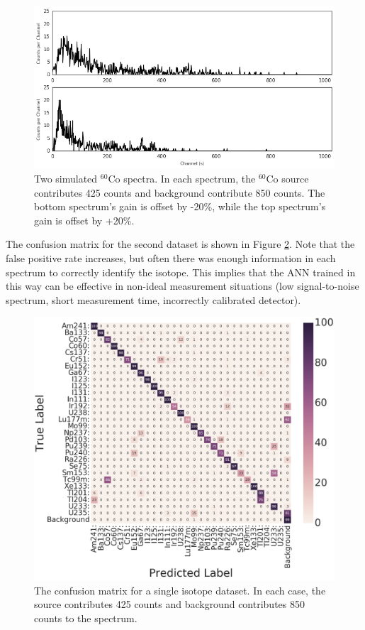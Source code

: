 \documentclass[tocnosub,noragright,centerchapter,12pt,fullpage]{uiucecethesis09}
\begin{document}
\begin{figure}[H]
\centering
\includegraphics[width=0.75\linewidth]{images/Co60_both_10s}
\caption{Two simulated $^{60}$Co spectra. In each spectrum, the $^{60}$Co source contributes 425 counts and background contribute 850 counts. The bottom spectrum's gain is offset by -20\%, while the top spectrum's gain is offset by +20\%.}
\label{fig:co60_diff_pmt_10s}
\end{figure}

The confusion matrix for the second dataset is shown in Figure \ref{fig:conf_matrix_10s}. Note that the false positive rate increases, but often there was enough information in each spectrum to correctly identify the isotope. This implies that the ANN trained in this way can be effective in non-ideal measurement situations (low signal-to-noise spectrum, short measurement time, incorrectly calibrated detector).

\begin{figure}[H]
\centering
\includegraphics[width=0.9\linewidth]{images/conf_matrix_10s}
\caption{The confusion matrix for a single isotope dataset. In each case, the source contributes 425 counts and background contributes 850 counts to the spectrum.}
\label{fig:conf_matrix_10s}
\end{figure}
\end{document}
